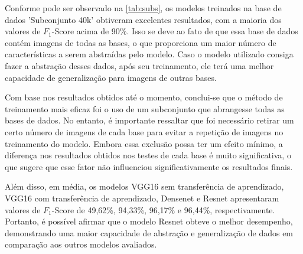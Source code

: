Conforme pode ser observado na \autoref{tab:subs}, os modelos treinados na base de dados 'Subconjunto 40k' obtiveram excelentes resultados, com a maioria dos valores de $F_{1}$-Score acima de 90\%. 
Isso se deve ao fato de que essa base de dados contém imagens de todas as bases, o que proporciona um maior número de características a serem abstraídas pelo modelo.
Caso o modelo utilizado consiga fazer a abstração desses dados, após seu treinamento, ele terá uma melhor capacidade de generalização para imagens de outras bases.

Com base nos resultados obtidos até o momento, conclui-se que o método de treinamento mais eficaz foi o uso de um subconjunto que abrangesse todas as bases de dados. 
No entanto, é importante ressaltar que foi necessário retirar um certo número de imagens de cada base para evitar a repetição de imagens no treinamento do modelo. 
Embora essa exclusão possa ter um efeito mínimo, a diferença nos resultados obtidos nos testes de cada base é muito significativa, o que sugere que esse fator não influenciou significativamente os resultados finais.

Além disso, em média, os modelos VGG16 sem transferência de aprendizado, VGG16 com transferência de aprendizado, Densenet e Resnet apresentaram valores de $F_{1}$-Score de 49,62\%, 94,33\%, 96,17\% e 96,44\%, respectivamente.
Portanto, é possível afirmar que o modelo Resnet obteve o melhor desempenho, demonstrando uma maior capacidade de abstração e generalização de dados em comparação aos outros modelos avaliados.